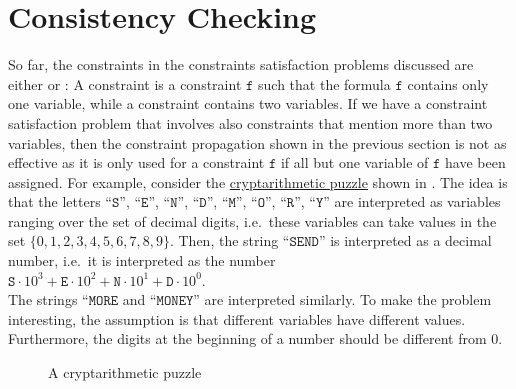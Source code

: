 \section{Consistency Checking \label{sec:consistency}}
So far, the constraints in the constraints satisfaction problems discussed are either  
or :  A  constraint is a constraint $\texttt{f}$
such that the formula $\texttt{f}$ contains only one variable, while a  constraint
contains two variables.  If we have a constraint satisfaction problem that involves also constraints that
mention more than two variables, then the constraint propagation shown in the previous section is not
as effective as it is only used for a constraint $\texttt{f}$ if all but one variable of $\texttt{f}$ have been assigned.
For example, consider the \href{https://en.wikipedia.org/wiki/Verbal_arithmetic}{cryptarithmetic puzzle} shown
in .  The idea is that the letters 
``$\texttt{S}$'', ``$\texttt{E}$'', ``$\texttt{N}$'', ``$\texttt{D}$'', ``$\texttt{M}$'', ``$\texttt{O}$'', ``$\texttt{R}$'', ``$\texttt{Y}$'' 
are interpreted as variables ranging over the set of decimal digits, i.e.~these variables can take values in
the set $\{0,1,2,3,4,5,6,7,8,9\}$.  Then, the string ``$\texttt{SEND}$'' is interpreted as a decimal number,
i.e.~it is interpreted as the number
\\[0.2cm]
\hspace*{1.3cm}
$\texttt{S} \cdot 10^3 + \texttt{E} \cdot 10^2 + \texttt{N} \cdot 10^1 + \texttt{D} \cdot 10^0$.
\\[0.2cm]
The strings ``$\texttt{MORE}$ and ``$\texttt{MONEY}$'' are interpreted similarly. To make the problem
interesting, the assumption is that different variables have different values.  Furthermore, the
digits at the beginning of a number should be different from $0$.


\begin{figure}[!ht]
\centering
{}

\caption{A cryptarithmetic puzzle}
\label{fig:send-more-money.pdf}
\end{figure}


